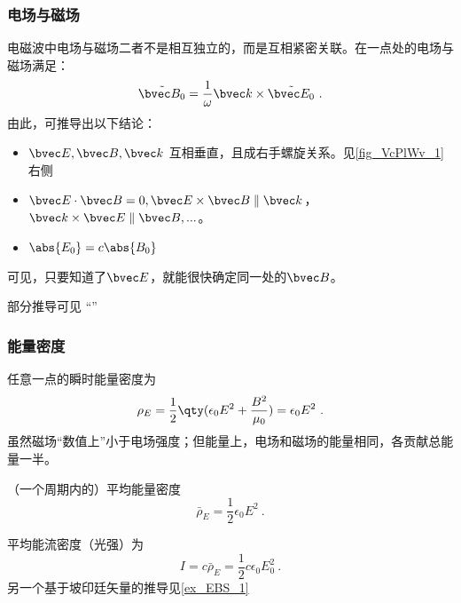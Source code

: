 \subsubsection{电场与磁场}
电磁波中电场与磁场二者不是相互独立的，而是互相紧密关联。在一点处的电场与磁场满足：
\begin{equation}
\tilde {\bvec B_0} = \frac{1}{\omega} \bvec k \times \tilde {\bvec E_0} ~.
\end{equation}
由此，可推导出以下结论：
\begin{itemize}
\item $\bvec E, \bvec B, \bvec k$ 互相垂直，且成右手螺旋关系。见\autoref{fig_VcPlWv_1} 右侧
\item $\bvec E \cdot \bvec B = 0,\bvec E \times \bvec B \parallel \bvec k$，$\bvec k \times \bvec E \parallel \bvec B, ...$。
\item $\abs{E_0}=c\abs{B_0}$
\end{itemize}
可见，只要知道了$\bvec E$，就能很快确定同一处的$\bvec B$。

部分推导可见 “”

\subsubsection{能量密度}
任意一点的瞬时能量密度为
\begin{equation}\label{eq_VcPlWv_2}
\rho_E = \frac{1}{2}\qty(\epsilon_0 E^2 + \frac{B^2}{\mu_0}) = \epsilon_0 E^2~.
\end{equation}
虽然磁场“数值上”小于电场强度；但能量上，电场和磁场的能量相同，各贡献总能量一半。 

（一个周期内的）平均能量密度
\begin{equation}
\bar \rho_E = \frac{1}{2} \epsilon_0 E^2~.
\end{equation}

平均能流密度（光强）为
\begin{equation}
I = c \bar \rho_E = \frac12 c\epsilon_0 E_0^2~.
\end{equation}
另一个基于坡印廷矢量的推导见\autoref{ex_EBS_1} %



